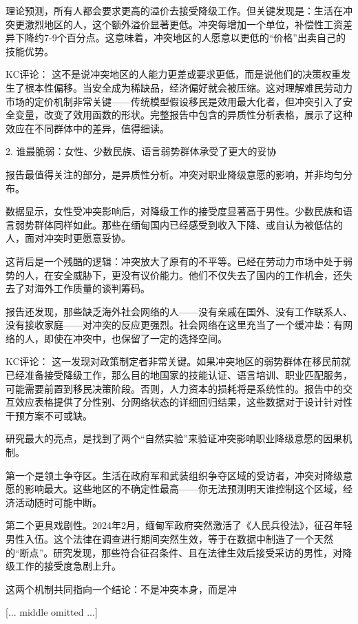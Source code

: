 \documentclass[11pt]{ctexart}
\begin{document}
理论预测，所有人都会要求更高的溢价去接受降级工作。但关键发现是：生活在冲突更激烈地区的人，这个额外溢价显著更低。冲突每增加一个单位，补偿性工资差异下降约7-9个百分点。这意味着，冲突地区的人愿意以更低的“价格”出卖自己的技能优势。

KC评论： 这不是说冲突地区的人能力更差或要求更低，而是说他们的决策权重发生了根本性偏移。当安全成为稀缺品，经济偏好就会被压缩。这对理解难民劳动力市场的定价机制非常关键——传统模型假设移民是效用最大化者，但冲突引入了安全变量，改变了效用函数的形状。完整报告中包含的异质性分析表格，展示了这种效应在不同群体中的差异，值得细读。

2. 谁最脆弱：女性、少数民族、语言弱势群体承受了更大的妥协

报告最值得关注的部分，是异质性分析。冲突对职业降级意愿的影响，并非均匀分布。

数据显示，女性受冲突影响后，对降级工作的接受度显著高于男性。少数民族和语言弱势群体同样如此。那些在缅甸国内已经感受到收入下降、或自认为被低估的人，面对冲突时更愿意妥协。

这背后是一个残酷的逻辑：冲突放大了原有的不平等。已经在劳动力市场中处于弱势的人，在安全威胁下，更没有议价能力。他们不仅失去了国内的工作机会，还失去了对海外工作质量的谈判筹码。

报告还发现，那些缺乏海外社会网络的人——没有亲戚在国外、没有工作联系人、没有接收家庭——对冲突的反应更强烈。社会网络在这里充当了一个缓冲垫：有网络的人，即使在冲突中，也保留了一定的选择空间。

KC评论： 这一发现对政策制定者非常关键。如果冲突地区的弱势群体在移民前就已经准备接受降级工作，那么目的地国家的技能认证、语言培训、职业匹配服务，可能需要前置到移民决策阶段。否则，人力资本的损耗将是系统性的。报告中的交互效应表格提供了分性别、分网络状态的详细回归结果，这些数据对于设计针对性干预方案不可或缺。

研究最大的亮点，是找到了两个“自然实验”来验证冲突影响职业降级意愿的因果机制。

第一个是领土争夺区。生活在政府军和武装组织争夺区域的受访者，冲突对降级意愿的影响最大。这些地区的不确定性最高——你无法预测明天谁控制这个区域，经济活动随时可能中断。

第二个更具戏剧性。2024年2月，缅甸军政府突然激活了《人民兵役法》，征召年轻男性入伍。这个法律在调查进行期间突然生效，等于在数据中制造了一个天然的“断点”。研究发现，那些符合征召条件、且在法律生效后接受采访的男性，对降级工作的接受度急剧上升。

这两个机制共同指向一个结论：不是冲突本身，而是冲

[... middle omitted ...]
\end{document}

